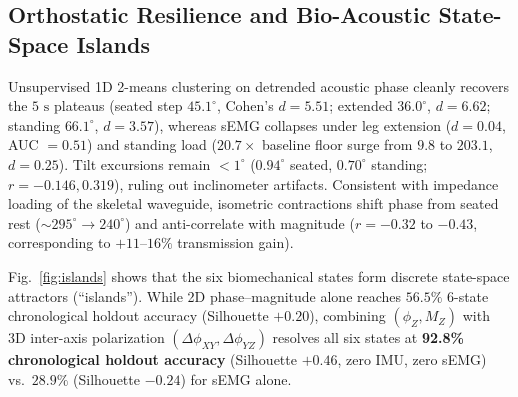 \documentclass[conference]{IEEEtran}
\begin{document}
\begin{table}[t]
\centering
\caption{Non-Circular Protocol-Frequency ($0.10\text{ Hz}$) SNR and Square-Wave Energy Concentration Across Modalities ($N=1$)}
\label{tab:snr}
\end{table}

\subsection{Orthostatic Resilience and Bio-Acoustic State-Space Islands}
Unsupervised 1D 2-means clustering on detrended acoustic phase cleanly recovers the $5\text{ s}$ plateaus (seated step $45.1^\circ$, Cohen's $d = 5.51$; extended $36.0^\circ$, $d = 6.62$; standing $66.1^\circ$, $d = 3.57$), whereas sEMG collapses under leg extension ($d = 0.04$, AUC $= 0.51$) and standing load ($20.7\times$ baseline floor surge from $9.8$ to $203.1$, $d = 0.25$). Tilt excursions remain $<1^\circ$ ($0.94^\circ$ seated, $0.70^\circ$ standing; $r = -0.146, 0.319$), ruling out inclinometer artifacts. Consistent with impedance loading of the skeletal waveguide, isometric contractions shift phase from seated rest ($\sim 295^\circ \to 240^\circ$) and anti-correlate with magnitude ($r = -0.32$ to $-0.43$, corresponding to $+11\text{--}16\%$ transmission gain).

Fig.~\ref{fig:islands} shows that the six biomechanical states form discrete state-space attractors (``islands''). While 2D phase--magnitude alone reaches $56.5\%$ 6-state chronological holdout accuracy (Silhouette $+0.20$), combining $(\phi_Z, M_Z)$ with 3D inter-axis polarization $(\Delta\phi_{XY}, \Delta\phi_{YZ})$ resolves all six states at \textbf{92.8\% chronological holdout accuracy} (Silhouette $+0.46$, zero IMU, zero sEMG) vs.\ $28.9\%$ (Silhouette $-0.24$) for sEMG alone.
\end{document}
